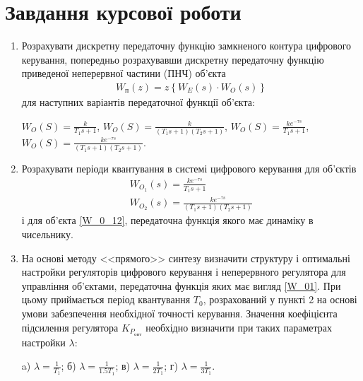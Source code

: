 \section{Завдання курсової роботи}
\begin{enumerate}
    \item Розрахувати дискретну передаточну функцію замкненого контура 
        цифрового керування, попередньо розрахувавши дискретну передаточну 
        функцію приведеної неперервної частини (ПНЧ) об'єкта
        \begin{gather}
            W_\text{п}(z) = z \left\{W_E(s) \cdot W_O(s) \right\}
        \end{gather} 
        для наступних варіантів передаточної функції об'єкта:

        \noindent
        $W_O(S) = \frac{k}{T_1 s + 1}$, $W_O(S) = \frac{k}{(T_1 s + 1)(T_2 s + 1)}$, 
        $W_O(S) = \frac{k e^{-\tau s}}{T_1 s + 1}$, $W_O(S) = \frac{k e^{-\tau s}}{(T_1 s + 1)(T_2 s + 1)}$.
    \item Розрахувати періоди квантування в системі цифрового керування для об'єктів
        \begin{gather}\label{W_01}
            W_{O_1}(s) = \frac{k e^{-\tau s}}{T_1 s + 1} \\
            \label{W_02}
            W_{O_2}(s) = \frac{k e^{-\tau s}}{(T_1 s + 1)(T_2 s + 1)}
        \end{gather}
        і для об'єкта \eqref{W_0_12}, передаточна функція якого має динаміку в чисельнику.
    \item На основі методу <<прямого>> синтезу визначити структуру і оптимальні настройки регуляторів цифрового керування і неперервного
        регулятора для управління об'єктами, передаточна функція яких має вигляд \eqref{W_01}. 
        При цьому приймається період квантування $T_0$, розрахований у пункті 2 на основі умови забезпечення необхідної точності керування.
        Значення коефіцієнта підсилення регулятора
        $K_{P_\text{опт}}$ необхідно визначити при таких параметрах настройки $\lambda$:

        a) $\lambda = \frac{1}{T_1}$; б) $\lambda = \frac{1}{1.5 T_1}$; в) $\lambda = \frac{1}{2T_1}$; г) $\lambda = \frac{1}{3T_1}$.


\end{enumerate}
